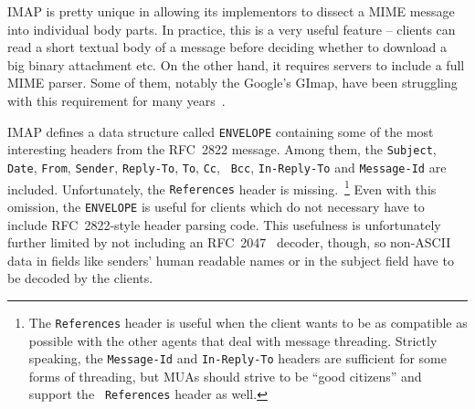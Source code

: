 \documentclass[trojita]{subfiles}
\begin{document}
IMAP is pretty unique in allowing its implementors to dissect a MIME message~\cite{rfc-mime} into individual body parts.
In practice, this is a very useful feature -- clients can read a short textual body of a message before deciding whether
to download a big binary attachment etc.  On the other hand, it requires servers to include a full MIME parser.  Some of
them, notably the Google's GImap, have been struggling with this requirement for many
years~\cite{gmail-bodystructure-sucks}.

IMAP defines a data structure called {\tt ENVELOPE} containing some of the most interesting headers from the RFC~2822
message.  Among them, the {\tt Subject}, {\tt Date}, {\tt From}, {\tt Sender}, {\tt Reply-To}, {\tt To}, {\tt Cc}, {\tt
Bcc}, {\tt In-Reply-To} and {\tt Message-Id} are included.  Unfortunately, the {\tt References} header is
missing.~\footnote{The {\tt References} header is useful when the client wants to be as compatible as possible with the
other agents that deal with message threading.  Strictly speaking, the {\tt Message-Id} and {\tt In-Reply-To} headers
are sufficient for some forms of threading, but MUAs should strive to be ``good citizens'' and support the {\tt
References} header as well.}  Even with this omission, the {\tt ENVELOPE} is useful for clients which do not necessary
have to include RFC~2822-style header parsing code.  This usefulness is unfortunately further limited by not including
an RFC~2047~\cite{rfc-mime-intl-headers} decoder, though, so non-ASCII data in fields like senders' human readable names
or in the subject field have to be decoded by the clients.




\end{document}
